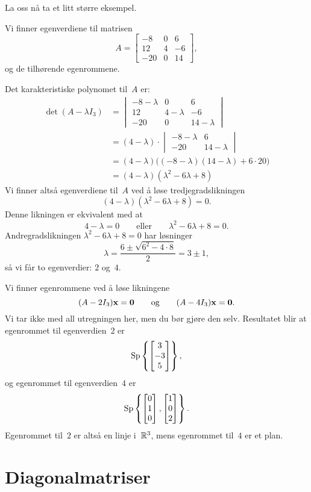 La oss nå ta et litt større eksempel.

\begin{ex}
Vi finner egenverdiene til matrisen
\[
A =
\begin{bmatrix}
 -8 & 0 &  6 \\
 12 & 4 & -6 \\
-20 & 0 & 14
\end{bmatrix},
\]
og de tilhørende egenrommene.

Det karakteristiske polynomet til~$A$ er:
\begin{align*}
\det (A - \lambda I_3)
&=
\begin{vmatrix}
 -8 - \lambda & 0           &  6           \\
 12           & 4 - \lambda & -6           \\
-20           & 0           & 14 - \lambda
\end{vmatrix}
\\
&= (4 - \lambda) \cdot
\begin{vmatrix}
 -8 - \lambda &  6           \\
-20           & 14 - \lambda
\end{vmatrix}
\\
&= (4 - \lambda) \big((-8 - \lambda) (14 - \lambda) + 6 \cdot 20\big)
\\
&= (4 - \lambda) (\lambda^2 - 6\lambda + 8)
\end{align*}
Vi finner altså egenverdiene til~$A$ ved å løse tredjegradslikningen
\[
(4 - \lambda) (\lambda^2 - 6\lambda + 8) = 0.
\]
Denne likningen er ekvivalent med at
\[
4 - \lambda = 0
\qquad\text{eller}\qquad
\lambda^2 - 6\lambda + 8 = 0.
\]
Andregradslikningen $\lambda^2 - 6\lambda + 8 = 0$ har løsninger
\[
\lambda = \frac{6 \pm \sqrt{6^2 - 4 \cdot 8}}{2} = 3 \pm 1,
\]
så vi får to egenverdier: $2$ og~$4$.

Vi finner egenrommene ved å løse likningene
\[
(A - 2 I_3) \mathbf{x} = \mathbf{0}
\qquad\text{og}\qquad
(A - 4 I_3) \mathbf{x} = \mathbf{0}.
\]
Vi tar ikke med all utregningen her, men du bør gjøre den selv.
Resultatet blir at egenrommet til egenverdien~$2$ er
\[
\operatorname{Sp} \left\{ \begin{bmatrix} 3 \\ -3 \\ 5 \end{bmatrix} \right\},
\]
og egenrommet til egenverdien~$4$ er
\[
\operatorname{Sp} \left\{ \begin{bmatrix} 0 \\ 1 \\ 0 \end{bmatrix}, \begin{bmatrix} 1 \\ 0 \\ 2 \end{bmatrix} \right\}.
\]
Egenrommet til~$2$ er altså en linje i~$\mathbb{R}^3$, mens egenrommet til~$4$
er et plan.
\end{ex}


\section*{Diagonalmatriser}

